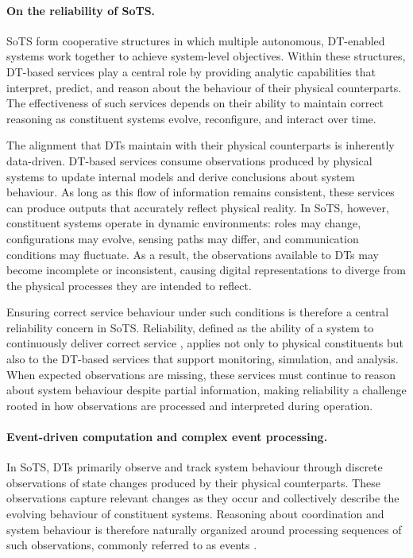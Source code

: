 \paragraph{On the reliability of SoTS.}
SoTS form cooperative structures in which multiple autonomous, DT-enabled systems work together to achieve system-level objectives. Within these structures, DT-based services play a central role by providing analytic capabilities that interpret, predict, and reason about the behaviour of their physical counterparts. The effectiveness of such services depends on their ability to maintain correct reasoning as constituent systems evolve, reconfigure, and interact over time.

The alignment that DTs maintain with their physical counterparts is inherently data-driven. DT-based services consume observations produced by physical systems to update internal models and derive conclusions about system behaviour. As long as this flow of information remains consistent, these services can produce outputs that accurately reflect physical reality. In SoTS, however, constituent systems operate in dynamic environments: roles may change, configurations may evolve, sensing paths may differ, and communication conditions may fluctuate. As a result, the observations available to DTs may become incomplete or inconsistent, causing digital representations to diverge from the physical processes they are intended to reflect.

Ensuring correct service behaviour under such conditions is therefore a central reliability concern in SoTS. Reliability, defined as the ability of a system to continuously deliver correct service \citep{avizienis2004basic}, applies not only to physical constituents but also to the DT-based services that support monitoring, simulation, and analysis. When expected observations are missing, these services must continue to reason about system behaviour despite partial information, making reliability a challenge rooted in how observations are processed and interpreted during operation.

\paragraph{Event-driven computation and complex event processing.}
In SoTS, DTs primarily observe and track system behaviour through discrete observations of state changes produced by their physical counterparts. These observations capture relevant changes as they occur and collectively describe the evolving behaviour of constituent systems. Reasoning about coordination and system behaviour is therefore naturally organized around processing sequences of such observations, commonly referred to as events \citep{luckham2002power}.

